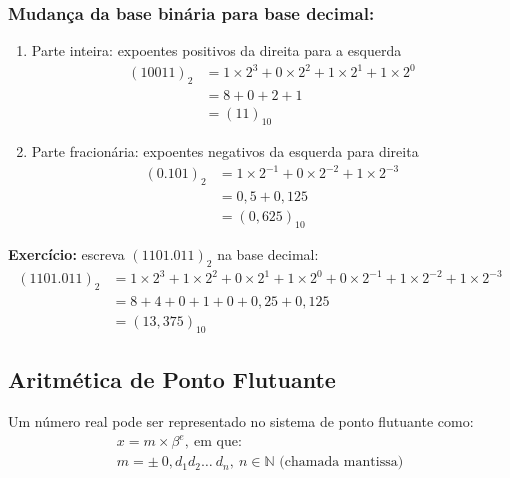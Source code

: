 \documentclass[a4paper,oneside,article,table]{article}
\begin{document}
        \subsubsection{Mudança da base binária para base decimal:}
        \begin{enumerate}
                \item Parte inteira: expoentes positivos da direita para a esquerda
                    \begin{align*}
                        {(10011)}_2 &= 1\times2^3 + 0\times2^2 + 1\times2^1 + 1\times2^0\\
                        &= 8 + 0 + 2 + 1\\
                        &= {(11)}_{10}
                    \end{align*}

                \item Parte fracionária: expoentes negativos da esquerda para direita
                    \begin{align*}
                        {(0.101)}_2 &= 1\times2^{-1} + 0\times2^{-2} + 1\times2^{-3}\\
                        &= 0,5 + 0,125\\
                        &= {(0,625)}_{10}
                    \end{align*}
        \end{enumerate}

        \textbf{Exercício:} escreva ${(1101.011)}_2$ na base decimal:
        \begin{align*}
            {(1101.011)}_2 &= 1\times2^3 + 1\times2^2 + 0\times2^1 + 1\times2^0 + 0\times2^{-1} + 1\times2^{-2} + 1\times2^{-3}\\
            &= 8 + 4 + 0 + 1 + 0 + 0,25 + 0,125\\
            &= {(13,375)}_{10}
        \end{align*}

        \subsection{Aritmética de Ponto Flutuante}
        Um número real pode ser representado no sistema de ponto flutuante como:
        \begin{gather*}
            x = m\times\beta^e,~\textrm{em que:}\\
            m = \pm~0,d_1d_2\ldots~d_n,~n \in \mathbb{N} \textrm{ (chamada mantissa)}
        \end{gather*}
\end{document}
